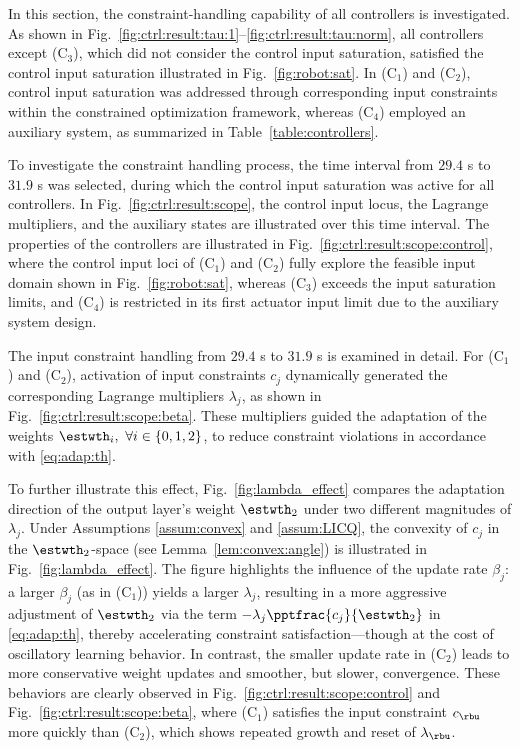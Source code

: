 \documentclass[letterpaper, journal]{IEEEtran}
\begin{document}
In this section, the constraint-handling capability of all controllers is investigated.
As shown in Fig.~\ref{fig:ctrl:result:tau:1}–\ref{fig:ctrl:result:tau:norm}, all controllers except (C$_3$), which did not consider the control input saturation, satisfied the control input saturation illustrated in Fig.~\ref{fig:robot:sat}.
In (C$_1$) and (C$_2$), control input saturation was addressed through corresponding input constraints within the constrained optimization framework, whereas (C$_4$) employed an auxiliary system, as summarized in Table~\ref{table:controllers}.

To investigate the constraint handling process, the time interval from $29.4$ s to $31.9$ s was selected, during which the control input saturation was active for all controllers.
In Fig.~\ref{fig:ctrl:result:scope}, the control input locus, the Lagrange multipliers, and the auxiliary states are illustrated over this time interval.
The properties of the controllers are illustrated in Fig.~\ref{fig:ctrl:result:scope:control}, where the control input loci of (C$_1$) and (C$_2$) fully explore the feasible input domain shown in Fig.~\ref{fig:robot:sat}, whereas (C$_3$) exceeds the input saturation limits, and (C$_4$) is restricted in its first actuator input limit due to the auxiliary system design.

The input constraint handling from $29.4$ s to $31.9$ s is examined in detail. 
For (C$_1$) and (C$_2$), activation of input constraints $c_j$ dynamically generated the corresponding Lagrange multipliers $\lambda_j$, as shown in Fig.~\ref{fig:ctrl:result:scope:beta}. 
These multipliers guided the adaptation of the weights $\estwth_i,\ \forall i\in\{0,1,2\}$, to reduce constraint violations in accordance with \eqref{eq:adap:th}.

To further illustrate this effect, Fig.~\ref{fig:lambda_effect} compares the adaptation direction of the output layer's weight $\estwth_2$ under two different magnitudes of $\lambda_j$. 
Under Assumptions \ref{assum:convex} and \ref{assum:LICQ}, the convexity of $c_j$ in the $\estwth_2$-space (see Lemma~\ref{lem:convex:angle}) is illustrated in Fig.~\ref{fig:lambda_effect}.
The figure highlights the influence of the update rate $\beta_j$: a larger $\beta_j$ (as in (C$_1$)) yields a larger $\lambda_j$, resulting in a more aggressive adjustment of $\estwth_2$ via the term $-\lambda_j\pptfrac{c_j}{\estwth_2}$ in \eqref{eq:adap:th}, thereby accelerating constraint satisfaction—though at the cost of oscillatory learning behavior. 
In contrast, the smaller update rate in (C$_2$) leads to more conservative weight updates and smoother, but slower, convergence.
These behaviors are clearly observed in Fig.~\ref{fig:ctrl:result:scope:control} and Fig.~\ref{fig:ctrl:result:scope:beta}, where (C$_1$) satisfies the input constraint $c_{\rbu}$ more quickly than (C$_2$), which shows repeated growth and reset of $\lambda_{\rbu}$. 
\end{document}
